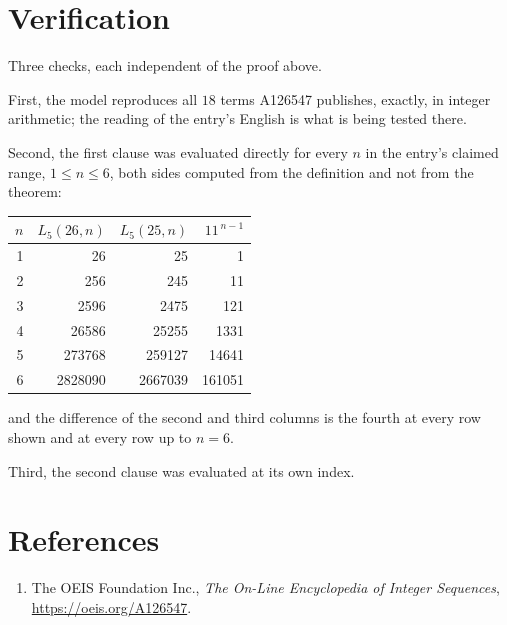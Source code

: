 \documentclass[11pt,a4paper]{article}
\theoremstyle{plain}
\theoremstyle{definition}
\begin{document}
\section{Verification}

Three checks, each independent of the proof above.

First, the model reproduces all $18$ terms A126547 publishes, exactly, in integer
arithmetic; the reading of the entry's English is what is being tested there.

Second, the first clause was evaluated directly for every $n$ in the entry's claimed range,
$1\le n\le6$, both sides computed from the definition and not from the theorem:

\begin{center}
\begin{tabular}{rrrr}
$n$ & $L_{5}(26,n)$ & $L_{5}(25,n)$ & $11^{\,n-1}$ \\ \hline
1 & 26 & 25 & 1 \\
2 & 256 & 245 & 11 \\
3 & 2596 & 2475 & 121 \\
4 & 26586 & 25255 & 1331 \\
5 & 273768 & 259127 & 14641 \\
6 & 2828090 & 2667039 & 161051 \\
\end{tabular}
\end{center}

\noindent and the difference of the second and third columns is the fourth at every row shown
and at every row up to $n=6$.

Third, the second clause was evaluated at its own index.

\section*{References}
\begin{enumerate}
\item The OEIS Foundation Inc., \emph{The On-Line Encyclopedia of Integer Sequences},
\url{https://oeis.org/A126547}.
\end{enumerate}
\end{document}

